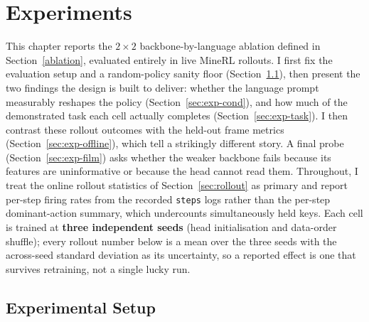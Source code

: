 \chapter{Experiments}
\label{chap:experiments}

This chapter reports the $2\times2$ backbone-by-language ablation defined in
Section~\ref{ablation}, evaluated entirely in live MineRL rollouts. I first fix
the evaluation setup and a random-policy sanity floor
(Section~\ref{sec:exp-setup}), then present the two findings the design is built
to deliver: whether the language prompt measurably reshapes the policy
(Section~\ref{sec:exp-cond}), and how much of the demonstrated task each cell
actually completes (Section~\ref{sec:exp-task}). I then contrast these rollout
outcomes with the held-out frame metrics (Section~\ref{sec:exp-offline}), which
tell a strikingly different story. A final probe
(Section~\ref{sec:exp-film}) asks whether the weaker backbone fails because its
features are uninformative or because the head cannot read them. Throughout, I
treat the online rollout statistics of Section~\ref{sec:rollout} as primary and
report per-step firing rates from the recorded \texttt{steps} logs rather than
the per-step dominant-action summary, which undercounts simultaneously held
keys. Each cell is trained at \textbf{three independent seeds} (head
initialisation and data-order shuffle); every rollout number below is a mean over
the three seeds with the across-seed standard deviation as its uncertainty, so a
reported effect is one that survives retraining, not a single lucky run.

\section{Experimental Setup}
\label{sec:exp-setup}

